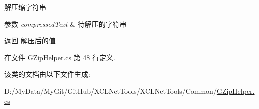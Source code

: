 解压缩字符串 


\begin{DoxyParams}{参数}
{\em compressed\-Text} & 待解压的字符串\\
\hline
\end{DoxyParams}
\begin{DoxyReturn}{返回}
解压后的值
\end{DoxyReturn}


在文件 G\-Zip\-Helper.\-cs 第 48 行定义.



该类的文档由以下文件生成\-:\begin{DoxyCompactItemize}
\item 
D\-:/\-My\-Data/\-My\-Git/\-Git\-Hub/\-X\-C\-L\-Net\-Tools/\-X\-C\-L\-Net\-Tools/\-Common/\hyperlink{_g_zip_helper_8cs}{G\-Zip\-Helper.\-cs}\end{DoxyCompactItemize}
